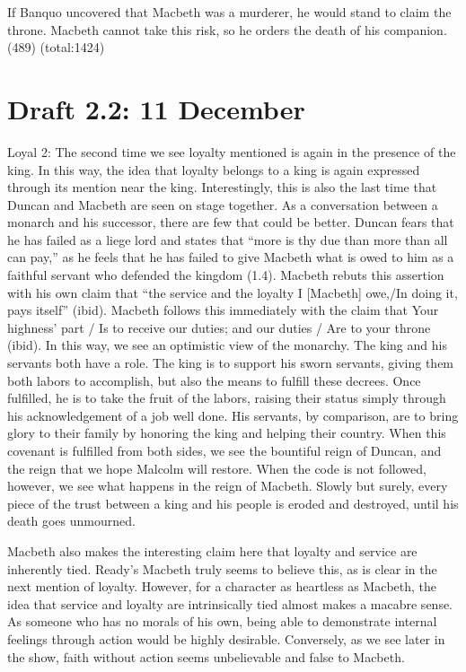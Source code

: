\documentclass[12pt]{article}[titlepage]
\newcommand{\say}[1]{``#1''}
\newcommand{\1}{\={a}}
\newcommand{\2}{\={e}}
\newcommand{\3}{\={\i}}
\newcommand{\4}{\=o}
\newcommand{\5}{\=u}
\newcommand{\6}{\={A}}
\renewcommand{\,}{\textsuperscript{,}}
\begin{document}
If Banquo uncovered that Macbeth was a murderer, he would stand to claim the throne.
Macbeth cannot take this risk, so he orders the death of his companion.
(489) (total:1424)
\section{Draft 2.2: 11 December}
Loyal 2:
The second time we see loyalty mentioned is again in the presence of the king.
In this way, the idea that loyalty belongs to a king is again expressed through its mention near the king.
Interestingly, this is also the last time that Duncan and Macbeth are seen on stage together.
As a conversation between a monarch and his successor, there are few that could be better.
Duncan fears that he has failed as a liege lord and states that \say{more is thy due than more than all can pay,} as he feels that he has failed to give Macbeth what is owed to him as a faithful servant who defended the kingdom (1.4).
Macbeth rebuts this assertion with his own claim that \say{the service and the loyalty I [Macbeth] owe,/In doing it, pays itself} (ibid).
Macbeth follows this immediately with the claim that {Your highness' part / Is to receive our duties; and our duties / Are to your throne} (ibid).
In this way, we see an optimistic view of the monarchy.
The king and his servants both have a role.
The king is to support his sworn servants, giving them both labors to accomplish, but also the means to fulfill these decrees.
Once fulfilled, he is to take the fruit of the labors, raising their status simply through his acknowledgement of a job well done.
His servants, by comparison, are to bring glory to their family by honoring the king and helping their country.
When this covenant is fulfilled from both sides, we see the bountiful reign of Duncan, and the reign that we hope Malcolm will restore.
When the code is not followed, however, we see what happens in the reign of Macbeth.
Slowly but surely, every piece of the trust between a king and his people is eroded and destroyed, until his death goes unmourned.

Macbeth also makes the interesting claim here that loyalty and service are inherently tied.
Ready's Macbeth truly seems to believe this, as is clear in the next mention of loyalty.
However, for a character as heartless as Macbeth, the idea that service and loyalty are intrinsically tied almost makes a macabre sense.
As someone who has no morals of his own, being able to demonstrate internal feelings through action would be highly desirable.
Conversely, as we see later in the show, faith without action seems unbelievable and false to Macbeth.
\end{document}
